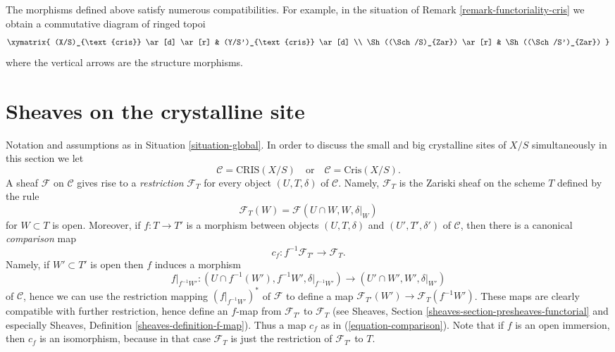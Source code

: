 \begin{remark}[Compatibilities]
\label{remark-compatibilities}
The morphisms defined above satisfy numerous compatibilities. For example,
in the situation of Remark \ref{remark-functoriality-cris}
we obtain a commutative diagram of ringed topoi
$$
\xymatrix{
(X/S)_{\text{cris}} \ar[d] \ar[r] & (Y/S')_{\text{cris}} \ar[d] \\
\Sh((\Sch/S)_{Zar}) \ar[r] & \Sh((\Sch/S')_{Zar})
}
$$
where the vertical arrows are the structure morphisms.
\end{remark}



\section{Sheaves on the crystalline site}
\label{section-sheaves}

\noindent
Notation and assumptions as in Situation \ref{situation-global}.
In order to discuss the small and big crystalline sites of $X/S$
simultaneously in this section we let
$$
\mathcal{C} = \text{CRIS}(X/S)
\quad\text{or}\quad
\mathcal{C} = \text{Cris}(X/S).
$$
A sheaf $\mathcal{F}$ on $\mathcal{C}$ gives rise to
a {\it restriction} $\mathcal{F}_T$ for every object $(U, T, \delta)$
of $\mathcal{C}$. Namely, $\mathcal{F}_T$ is the Zariski sheaf on
the scheme $T$ defined by the rule
$$
\mathcal{F}_T(W) = \mathcal{F}(U \cap W, W, \delta|_W)
$$
for $W \subset T$ is open. Moreover, if $f : T \to T'$ is a morphism
between objects
$(U, T, \delta)$ and $(U', T', \delta')$ of $\mathcal{C}$, then there
is a canonical {\it comparison} map
\begin{equation}
\label{equation-comparison}
c_f : f^{-1}\mathcal{F}_{T'} \longrightarrow \mathcal{F}_T.
\end{equation}
Namely, if $W' \subset T'$ is open then $f$ induces a morphism
$$
f|_{f^{-1}W'} :
(U \cap f^{-1}(W'), f^{-1}W', \delta|_{f^{-1}W'})
\longrightarrow
(U' \cap W', W', \delta|_{W'})
$$
of $\mathcal{C}$, hence we can use the restriction mapping
$(f|_{f^{-1}W'})^*$ of $\mathcal{F}$ to define a map
$\mathcal{F}_{T'}(W') \to \mathcal{F}_T(f^{-1}W')$.
These maps are clearly compatible with further restriction, hence
define an $f$-map from $\mathcal{F}_{T'}$ to $\mathcal{F}_T$ (see
Sheaves, Section \ref{sheaves-section-presheaves-functorial}
and especially
Sheaves, Definition \ref{sheaves-definition-f-map}).
Thus a map $c_f$ as in (\ref{equation-comparison}).
Note that if $f$ is an open immersion, then $c_f$ is an
isomorphism, because in that case $\mathcal{F}_T$ is just
the restriction of $\mathcal{F}_{T'}$ to $T$.


